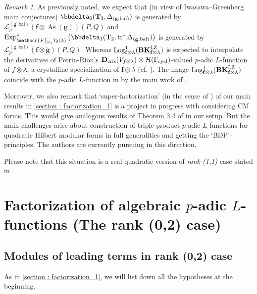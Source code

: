 \documentclass[10pt]{amsart}
\numberwithin{equation}{section}
\theoremstyle{definition}
\theoremstyle{remark} %
\newtheorem{rmk}[thm]{Remark}
\newcommand{\mbf}{\mathbf}
\newcommand{\scr}{\mathscr}
\newcommand{\mrm}{\mathrm}
\newcommand{\cal}{\mathcal}
\newcommand{\As}{\operatorname{As}}
\newcommand{\Exp}{\operatorname{Exp}}
\newcommand{\Log}{\operatorname{Log}}
\renewcommand{\b}{\mathrm{bal}}
\newcommand{\f}{\mathbf{f}}
\newcommand{\scrF}{\mathscr{F}}
\newcommand{\g}{\mathbf{g}}
\newcommand{\p}{\mathfrak{p}}
\newcommand{\T}{\mathbf{T}}
\begin{document}
		\begin{rmk}
			As previously noted, we expect that (in view of Iwasawa–Greenberg main conjectures) $ \bbdelta_0(\T_{3}, \Delta_{(\g, \b)}) $ is generated by $ 	\scr{L}_p^{(\g,\b)}(\f \otimes \As(\g) )(P,Q)  $ and $ \Exp^*_{\scrF^-_{\p_1} T_{\f}(\lambda)}\left( \bbdelta_1(\T_2, \operatorname{tr}^*\Delta_{(\g,\b)})\right)  $ is generated by $ \scr{L}_p^{(\g,\b)}(\f \otimes \breve{\g} )(P,Q) $. Whereas $ \Log_{\f \otimes \lambda}^1(\mathbf{BK}^{\rm LZ}_{\f\otimes \lambda}) $ is expected to interpolate the derivatives of Perrin-Riou's $ \mbf D_{\rm cris}(V_{f \otimes \lambda}) \otimes \cal{H}(\Gamma_{\mrm{cycl}}) $-valued $ p $-adic $ L $-function of $ f \otimes \lambda $, a crystalline specialization of $ \f \otimes\lambda $ (cf. \cite{PR93,perrin-riou_padic}). The image $ \Log_{\f \otimes \lambda}^1(\mathbf{BK}^{\rm LZ}_{\f\otimes \lambda}) $ coincide with the $ p $-adic $ L $-function in \cite[Theorem 0.1]{Dimitrov13} by the main work of \cite{loeffler2020iwasawatheoryquadratichilbert}. 
			
			Moreover, we also remark that \enquote*{super-factorization} (in the sense of \cite{BC25}) of our main results in \cref{section : factorization_1} is a project in progress with considering CM forms. This would give analogous results of Theorem 3.4 of \cite{BC25} in our setup. But the main challenges arise about construction of triple product $ p $-adic $ L $-functions for quadratic Hilbert modular forms in full generalities and getting the \enquote*{BDP}-principles. The authors are currently pursuing in this direction.
			
			Please note that this situation is a real quadratic version of \emph{rank (1,1)} case stated in \cite[.2]{Darmon16GenralisedKatoClasses}.
			
		\end{rmk}
		\section{Factorization of algebraic $p$-adic $L$-functions (The rank (0,2) case)}
		\label{section : factorization_2}
		\subsection{Modules of leading terms in rank (0,2) case}
		As in \cref{section : factorization_1}, we will list down all the hypotheses at the beginning.
\end{document}
